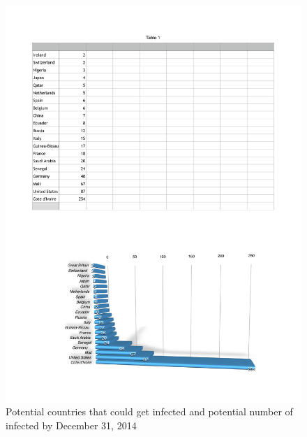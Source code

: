 \documentclass[10pt, journal,onecolumn]{IEEEtran}
\begin{document}
\begin{figure}[ht]
\centering
\includegraphics[scale=.5]{countriesinfected.pdf}
\caption{Potential countries that could get infected and potential number of infected by December 31, 2014}
\label{Fig:world_infected}
\end{figure}
\end{document}
